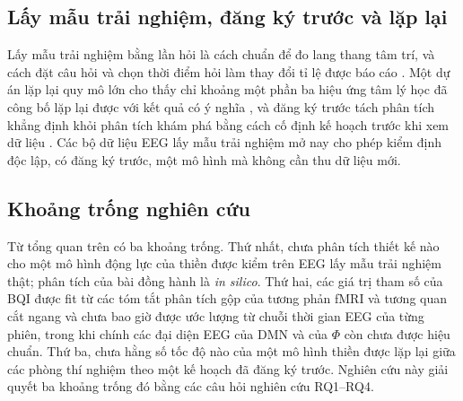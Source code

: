 \subsection{Lấy mẫu trải nghiệm, đăng ký trước và lặp lại}
Lấy mẫu trải nghiệm bằng lần hỏi là cách chuẩn để đo lang thang tâm trí, và cách đặt câu hỏi và chọn thời điểm hỏi làm thay đổi tỉ lệ được báo cáo \cite{Weinstein2018}. Một dự án lặp lại quy mô lớn cho thấy chỉ khoảng một phần ba hiệu ứng tâm lý học đã công bố lặp lại được với kết quả có ý nghĩa \cite{OSC2015}, và đăng ký trước tách phân tích khẳng định khỏi phân tích khám phá bằng cách cố định kế hoạch trước khi xem dữ liệu \cite{Nosek2018}. Các bộ dữ liệu EEG lấy mẫu trải nghiệm mở \cite{Delorme2024ds,RodriguezLarios2021} nay cho phép kiểm định độc lập, có đăng ký trước, một mô hình mà không cần thu dữ liệu mới.

\subsection{Khoảng trống nghiên cứu}
\label{sec:gap}
Từ tổng quan trên có ba khoảng trống. Thứ nhất, chưa phân tích thiết kế nào cho một mô hình động lực của thiền được kiểm trên EEG lấy mẫu trải nghiệm thật; phân tích của bài đồng hành là \emph{in silico}. Thứ hai, các giá trị tham số của BQI được fit từ các tóm tắt phân tích gộp của tương phản fMRI và tương quan cắt ngang \cite[Mục~7.2--7.5]{BQI} và chưa bao giờ được ước lượng từ chuỗi thời gian EEG của từng phiên, trong khi chính các đại diện EEG của DMN và của $\Phi$ còn chưa được hiệu chuẩn. Thứ ba, chưa hằng số tốc độ nào của một mô hình thiền được lặp lại giữa các phòng thí nghiệm theo một kế hoạch đã đăng ký trước. Nghiên cứu này giải quyết ba khoảng trống đó bằng các câu hỏi nghiên cứu RQ1--RQ4.

